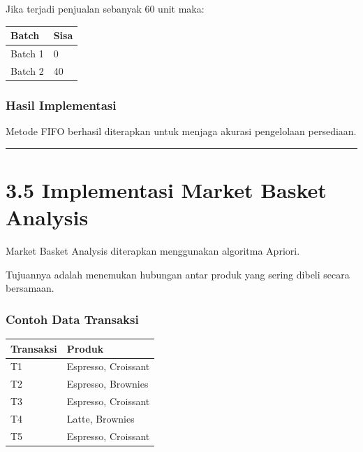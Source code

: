 Jika terjadi penjualan sebanyak 60 unit maka:

{\def\LTcaptype{none} %
\begin{longtable}[]{@{}ll@{}}
\toprule\noalign{}
Batch & Sisa \\
\midrule\noalign{}
\endhead
\bottomrule\noalign{}
\endlastfoot
Batch 1 & 0 \\
Batch 2 & 40 \\
\end{longtable}
}

\subsubsection{Hasil Implementasi}\label{hasil-implementasi-8}

Metode FIFO berhasil diterapkan untuk menjaga akurasi pengelolaan persediaan.

\begin{center}\rule{0.5\linewidth}{0.5pt}\end{center}

\section{3.5 Implementasi Market Basket Analysis}\label{implementasi-market-basket-analysis}

Market Basket Analysis diterapkan menggunakan algoritma Apriori.

Tujuannya adalah menemukan hubungan antar produk yang sering dibeli secara bersamaan.

\subsubsection{Contoh Data Transaksi}\label{contoh-data-transaksi}

{\def\LTcaptype{none} %
\begin{longtable}[]{@{}ll@{}}
\toprule\noalign{}
Transaksi & Produk \\
\midrule\noalign{}
\endhead
\bottomrule\noalign{}
\endlastfoot
T1 & Espresso, Croissant \\
T2 & Espresso, Brownies \\
T3 & Espresso, Croissant \\
T4 & Latte, Brownies \\
T5 & Espresso, Croissant \\
\end{longtable}
}

